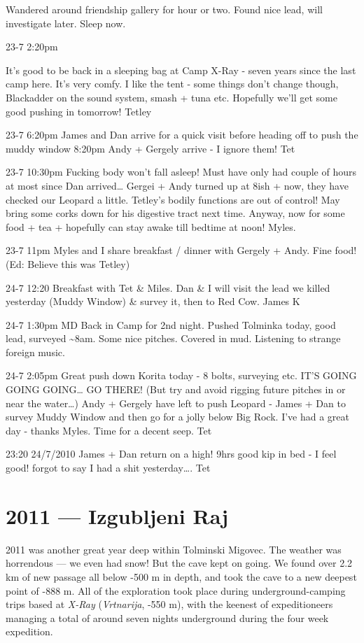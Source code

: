 Wandered around friendship gallery for hour or two. Found nice lead,
will investigate later. Sleep now.

23-7 2:20pm

It's good to be back in a sleeping bag at Camp X-Ray - seven years since
the last camp here. It's very comfy. I like the tent - some things don't
change though, Blackadder on the sound system, smash + tuna etc.
Hopefully we'll get some good pushing in tomorrow! Tetley

23-7 6:20pm James and Dan arrive for a quick visit before heading off to
push the muddy window 8:20pm Andy + Gergely arrive - I ignore them! Tet

23-7 10:30pm Fucking body won't fall asleep! Must have only had couple
of hours at most since Dan arrived\ldots{} Gergei + Andy turned up at
8ish + now, they have checked our Leopard a little. Tetley's bodily
functions are out of control! May bring some corks down for his
digestive tract next time. Anyway, now for some food + tea + hopefully
can stay awake till bedtime at noon! Myles.

23-7 11pm Myles and I share breakfast / dinner with Gergely + Andy. Fine
food! (Ed: Believe this was Tetley)

24-7 12:20 Breakfast with Tet \& Miles. Dan \& I will visit the lead we
killed yesterday (Muddy Window) \& survey it, then to Red Cow. James K

24-7 1:30pm MD Back in Camp for 2nd night. Pushed Tolminka today, good
lead, surveyed \textasciitilde{}8am. Some nice pitches. Covered in mud.
Listening to strange foreign music.

24-7 2:05pm Great push down Korita today - 8 bolts, surveying etc. IT'S
GOING GOING GOING\ldots{} GO THERE! (But try and avoid rigging future
pitches in or near the water\ldots{}) Andy + Gergely have left to push
Leopard - James + Dan to survey Muddy Window and then go for a jolly
below Big Rock. I've had a great day - thanks Myles. Time for a decent
seep. Tet

23:20 24/7/2010 James + Dan return on a high! 9hrs good kip in bed - I
feel good! forgot to say I had a shit yesterday\ldots{}. Tet

\hypertarget{izgubljeni-raj}{%
\chapter{2011 --- Izgubljeni Raj}\label{izgubljeni-raj}}

2011 was another great year deep within Tolminski Migovec. The weather
was horrendous --- we even had snow! But the cave kept on going. We
found over 2.2 km of new passage all below -500 m in depth, and took the
cave to a new deepest point of -888 m. All of the exploration took place
during underground-camping trips based at \emph{X-Ray}
(\emph{Vrtnarija}, -550 m), with the keenest of expeditioneers managing
a total of around seven nights underground during the four week
expedition.


